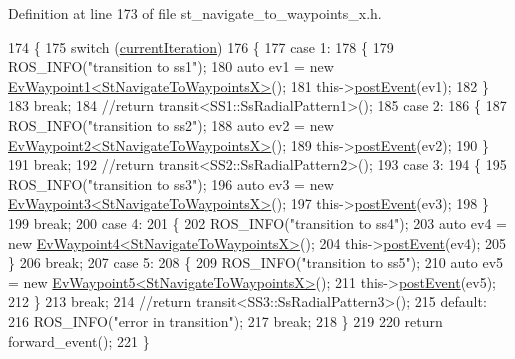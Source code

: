 Definition at line 173 of file st\+\_\+navigate\+\_\+to\+\_\+waypoints\+\_\+x.\+h.


\begin{DoxyCode}
174   \{
175     \textcolor{keywordflow}{switch} (\hyperlink{structStNavigateToWaypointsX_a2f597fd0ee0258ef66506e98d55e8060}{currentIteration})
176     \{
177     \textcolor{keywordflow}{case} 1:
178     \{
179       ROS\_INFO(\textcolor{stringliteral}{"transition to ss1"});
180       \textcolor{keyword}{auto} ev1 = \textcolor{keyword}{new} \hyperlink{structEvWaypoint1}{EvWaypoint1<StNavigateToWaypointsX>}();
181       this->\hyperlink{classsmacc_1_1ISmaccState_acef404ab3766ddf2892e8dad14a4a7cf}{postEvent}(ev1);
182     \}
183     \textcolor{keywordflow}{break};
184       \textcolor{comment}{//return transit<SS1::SsRadialPattern1>();}
185     \textcolor{keywordflow}{case} 2:
186     \{
187       ROS\_INFO(\textcolor{stringliteral}{"transition to ss2"});
188       \textcolor{keyword}{auto} ev2 = \textcolor{keyword}{new} \hyperlink{structEvWaypoint2}{EvWaypoint2<StNavigateToWaypointsX>}();
189       this->\hyperlink{classsmacc_1_1ISmaccState_acef404ab3766ddf2892e8dad14a4a7cf}{postEvent}(ev2);
190     \}
191     \textcolor{keywordflow}{break};
192       \textcolor{comment}{//return transit<SS2::SsRadialPattern2>();}
193     \textcolor{keywordflow}{case} 3:
194     \{
195       ROS\_INFO(\textcolor{stringliteral}{"transition to ss3"});
196       \textcolor{keyword}{auto} ev3 = \textcolor{keyword}{new} \hyperlink{structEvWaypoint3}{EvWaypoint3<StNavigateToWaypointsX>}();
197       this->\hyperlink{classsmacc_1_1ISmaccState_acef404ab3766ddf2892e8dad14a4a7cf}{postEvent}(ev3);
198     \}
199     \textcolor{keywordflow}{break};
200     \textcolor{keywordflow}{case} 4:
201     \{
202       ROS\_INFO(\textcolor{stringliteral}{"transition to ss4"});
203       \textcolor{keyword}{auto} ev4 = \textcolor{keyword}{new} \hyperlink{structEvWaypoint4}{EvWaypoint4<StNavigateToWaypointsX>}();
204       this->\hyperlink{classsmacc_1_1ISmaccState_acef404ab3766ddf2892e8dad14a4a7cf}{postEvent}(ev4);
205     \}
206     \textcolor{keywordflow}{break};
207     \textcolor{keywordflow}{case} 5:
208     \{
209       ROS\_INFO(\textcolor{stringliteral}{"transition to ss5"});
210       \textcolor{keyword}{auto} ev5 = \textcolor{keyword}{new} \hyperlink{structEvWaypoint5}{EvWaypoint5<StNavigateToWaypointsX>}();
211       this->\hyperlink{classsmacc_1_1ISmaccState_acef404ab3766ddf2892e8dad14a4a7cf}{postEvent}(ev5);
212     \}
213     \textcolor{keywordflow}{break};
214       \textcolor{comment}{//return transit<SS3::SsRadialPattern3>();}
215     \textcolor{keywordflow}{default}:
216       ROS\_INFO(\textcolor{stringliteral}{"error in transition"});
217       \textcolor{keywordflow}{break};
218     \}
219 
220     \textcolor{keywordflow}{return} forward\_event();
221   \}
\end{DoxyCode}
